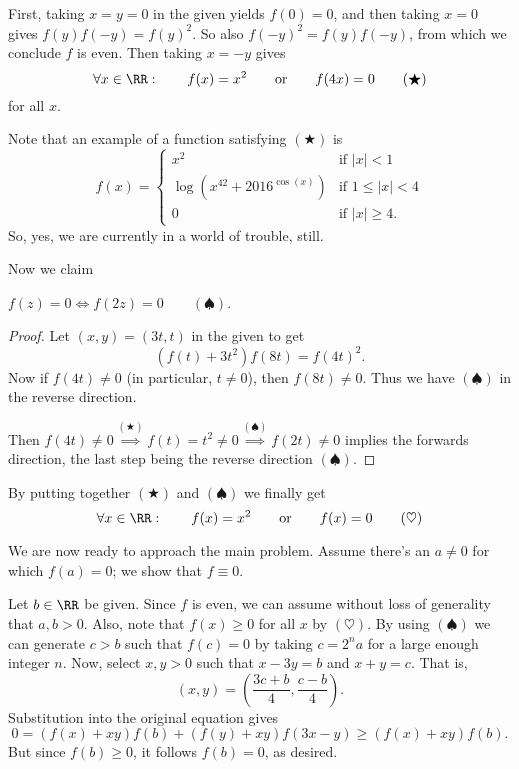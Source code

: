 \documentclass[11pt]{scrartcl}
\begin{document}
First, taking $x=y=0$ in the given yields $f(0) = 0$,
and then taking $x=0$ gives $f(y)f(-y) = f(y)^2$.
So also $f(-y)^2 = f(y)f(-y)$, from which we conclude $f$ is even.
Then taking $x = -y$ gives
\[ \forall x \in \RR : \qquad
f(x) = x^2 \qquad\text{or}\qquad f(4x) = 0 \qquad(\bigstar) \]
for all $x$.

\begin{remark*}
  Note that an example of a function satisfying $(\bigstar)$ is
  \[
    f(x)
    =
    \begin{cases}
      x^2 & \text{if } |x| < 1 \\
      \log(x^{42} + 2016^{\cos(x)}) & \text{if } 1 \le |x| < 4 \\
      0 & \text{if } |x| \ge 4.
    \end{cases}
  \]
  So, yes, we are currently in a world of trouble, still.
\end{remark*}

Now we claim
\begin{claim*}
  $f(z) = 0 \iff f(2z) = 0 \qquad (\spadesuit)$.
\end{claim*}
\begin{proof}
  Let $(x,y)=(3t,t)$ in the given to get
  \[ \left( f(t)+3t^2 \right)f(8t) = f(4t)^2. \]
  Now if $f(4t) \neq 0$ (in particular, $t \neq 0$),
  then $f(8t) \neq 0$.
  Thus we have $(\spadesuit)$ in the reverse direction.

  Then $f(4t) \neq 0 \overset{(\bigstar)}{\implies} f(t) = t^2 \neq 0
  \overset{(\spadesuit)}{\implies} f(2t) \neq 0$
  implies the forwards direction,
  the last step being the reverse direction $(\spadesuit)$.
\end{proof}

By putting together $(\bigstar)$ and $(\spadesuit)$ we finally get
\[ \forall x \in \RR : \qquad
f(x) = x^2 \qquad\text{or}\qquad f(x) = 0 \qquad(\heartsuit) \]

We are now ready to approach the main problem.
Assume there's an $a \neq 0$ for which $f(a) = 0$;
we show that $f \equiv 0$.

Let $b \in \RR$ be given.
Since $f$ is even, we can assume without loss of generality that $a, b > 0$.
Also, note that $f(x) \ge 0$ for all $x$ by $(\heartsuit)$.
By using $(\spadesuit)$ we can generate $c > b$
such that $f(c) = 0$ by taking $c = 2^n a$ for a large enough integer $n$.
Now, select $x, y > 0$ such that
$x-3y=b$ and $x+y=c$. That is,
\[
  (x,y) = \left( \frac{3c+b}{4}, \frac{c-b}{4} \right).
\]
Substitution into the original equation gives
\[
  0 = \left( f(x) + xy \right) f(b)
  + \left( f(y) + xy \right) f(3x-y)
  \ge \left( f(x) + xy \right) f(b).
\]
But since $f(b) \ge 0$, it follows $f(b) = 0$, as desired.
\pagebreak
\end{document}
